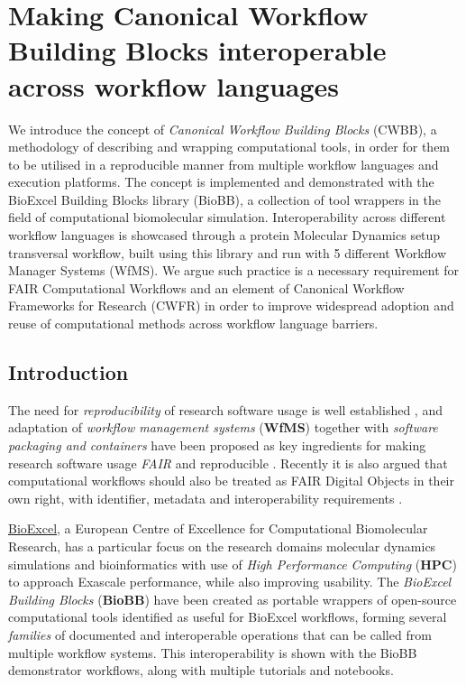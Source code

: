 \section{Making Canonical Workflow Building Blocks interoperable across
workflow
languages}
\label{making-canonical-workflow-building-blocks-interoperable-across-workflow-languages}

We introduce the concept of \emph{Canonical Workflow Building Blocks}
(CWBB), a methodology of describing and wrapping computational tools, in
order for them to be utilised in a reproducible manner from multiple
workflow languages and execution platforms. The concept is implemented
and demonstrated with the BioExcel Building Blocks library (BioBB), a
collection of tool wrappers in the field of computational biomolecular
simulation. Interoperability across different workflow languages is
showcased through a protein Molecular Dynamics setup transversal
workflow, built using this library and run with 5 different Workflow
Manager Systems (WfMS). We argue such practice is a necessary
requirement for FAIR Computational Workflows and an element of Canonical
Workflow Frameworks for Research (CWFR) in order to improve widespread
adoption and reuse of computational methods across workflow language
barriers.

\subsection{Introduction}\label{introduction-1}

The need for \emph{reproducibility} of research software usage is well
established \cite{Stodden 2016,Leipzig 2021,ch6-3}, and adaptation of \emph{workflow management
systems} (\textbf{WfMS}) together with \emph{software packaging and
containers} \cite{ch6-4} have been proposed as key ingredients for making
research software usage \emph{FAIR} and reproducible \cite{Cohen-Boulakia 2017,Gruning 2018b,Lamprecht 2019}.
Recently it is also argued that computational workflows should also be
treated as FAIR Digital Objects \cite{De Smedt 2020} in their own right, with
identifier, metadata \cite{Leipzig 2021} and interoperability requirements \cite{Goble 2020}.

\href{https://bioexcel.eu/}{BioExcel}, a European Centre of Excellence
for Computational Biomolecular Research, has a particular focus on the
research domains molecular dynamics simulations and bioinformatics with
use of \emph{High Performance Computing} (\textbf{HPC}) to approach
Exascale performance, while also improving usability. The \emph{BioExcel
Building Blocks} (\textbf{BioBB}) \cite{ch6-10} have been created as portable
wrappers of open-source computational tools identified as useful for
BioExcel workflows, forming several \emph{families} of documented and
interoperable operations that can be called from multiple workflow
systems. This interoperability is shown with the BioBB demonstrator
workflows, along with multiple tutorials and notebooks.

